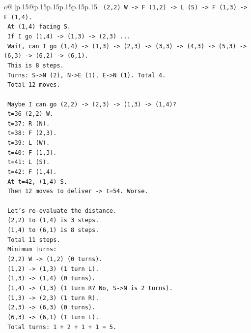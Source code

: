 \documentclass{article}
\begin{document}
{\begin{supertabular}{c@{$\;$}|p{.15\linewidth}@{}p{.15\linewidth}p{.15\linewidth}p{.15\linewidth}p{.15\linewidth}p{.15\linewidth}}
{{{\texttt{   (2,2) W {-}> F (1,2) {-}> L (S) {-}> F (1,3) {-}> F (1,4).} \\
\texttt{   At (1,4) facing S.} \\
\texttt{   If I go (1,4) {-}> (1,3) {-}> (2,3) ...} \\
\texttt{   Wait, can I go (1,4) {-}> (1,3) {-}> (2,3) {-}> (3,3) {-}> (4,3) {-}> (5,3) {-}> (6,3) {-}> (6,2) {-}> (6,1).} \\
\texttt{   This is 8 steps.} \\
\texttt{   Turns: S{-}>N (2), N{-}>E (1), E{-}>N (1). Total 4.} \\
\texttt{   Total 12 moves.} \\
\\ 
\texttt{   Maybe I can go (2,2) {-}> (2,3) {-}> (1,3) {-}> (1,4)?} \\
\texttt{   t=36 (2,2) W.} \\
\texttt{   t=37: R (N).} \\
\texttt{   t=38: F (2,3).} \\
\texttt{   t=39: L (W).} \\
\texttt{   t=40: F (1,3).} \\
\texttt{   t=41: L (S).} \\
\texttt{   t=42: F (1,4).} \\
\texttt{   At t=42, (1,4) S.} \\
\texttt{   Then 12 moves to deliver {-}> t=54. Worse.} \\
\\ 
\texttt{   Let's re{-}evaluate the distance.} \\
\texttt{   (2,2) to (1,4) is 3 steps.} \\
\texttt{   (1,4) to (6,1) is 8 steps.} \\
\texttt{   Total 11 steps.} \\
\texttt{   Minimum turns:} \\
\texttt{   (2,2) W {-}> (1,2) (0 turns).} \\
\texttt{   (1,2) {-}> (1,3) (1 turn L).} \\
\texttt{   (1,3) {-}> (1,4) (0 turns).} \\
\texttt{   (1,4) {-}> (1,3) (1 turn R? No, S{-}>N is 2 turns).} \\
\texttt{   (1,3) {-}> (2,3) (1 turn R).} \\
\texttt{   (2,3) {-}> (6,3) (0 turns).} \\
\texttt{   (6,3) {-}> (6,1) (1 turn L).} \\
\texttt{   Total turns: 1 + 2 + 1 + 1 = 5.} \\
}}}
\end{supertabular}}
\end{document}
